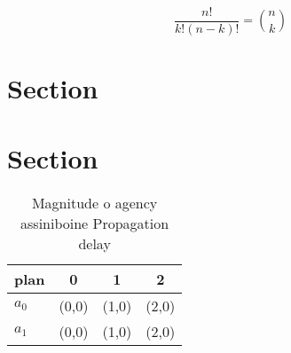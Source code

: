 \documentclass[a4paper]{article}
\begin{document}
\[ \frac{n!}{k!(n-k)!} = \binom{n}{k} \]

\section{Section}

\section{Section}

\begin{table}
\begin{adjustbox}{width=0.6\columnwidth}
\begin{tabular}{|l|l|l|l|}
\hline
\textbf{plan} & \multicolumn{1}{c|}{\textbf{0}} & \multicolumn{1}{c|}{\textbf{1}} & \multicolumn{1}{c|}{\textbf{2}} \\ \hline
\textbf{$a_0$}  & (0,0) & (1,0) & (2,0) \\ \hline
\textbf{$a_1$}  & (0,0) & (1,0) & (2,0) \\ \hline
\end{tabular}
\end{adjustbox}
\caption{Magnitude o agency assiniboine Propagation delay 
}
\end{table}
\end{document}
